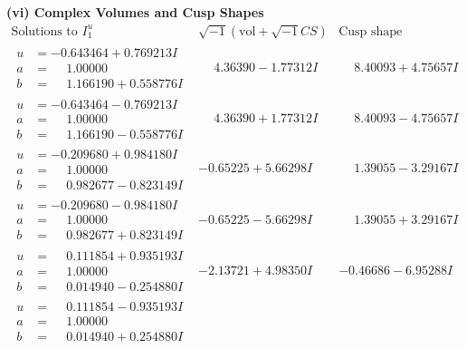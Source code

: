 \documentclass[1p]{elsarticle_modified}
\theoremstyle{definition}
\newcommand{\I}{\sqrt{-1}}
\begin{document}
\newpage\flushleft \textbf{(vi) Complex Volumes and Cusp Shapes}
$$\begin{array}{c|c|c}  
\text{Solutions to }I^u_{1}& \I (\text{vol} + \sqrt{-1}CS) & \text{Cusp shape}\\
 \hline 
\begin{aligned}
u &= -0.643464 + 0.769213 I \\
a &= \phantom{-}1.00000\phantom{ +0.000000I} \\
b &= \phantom{-}1.166190 + 0.558776 I\end{aligned}
 & \phantom{-}4.36390 - 1.77312 I & \phantom{-}8.40093 + 4.75657 I \\ \hline\begin{aligned}
u &= -0.643464 - 0.769213 I \\
a &= \phantom{-}1.00000\phantom{ +0.000000I} \\
b &= \phantom{-}1.166190 - 0.558776 I\end{aligned}
 & \phantom{-}4.36390 + 1.77312 I & \phantom{-}8.40093 - 4.75657 I \\ \hline\begin{aligned}
u &= -0.209680 + 0.984180 I \\
a &= \phantom{-}1.00000\phantom{ +0.000000I} \\
b &= \phantom{-}0.982677 - 0.823149 I\end{aligned}
 & -0.65225 + 5.66298 I & \phantom{-}1.39055 - 3.29167 I \\ \hline\begin{aligned}
u &= -0.209680 - 0.984180 I \\
a &= \phantom{-}1.00000\phantom{ +0.000000I} \\
b &= \phantom{-}0.982677 + 0.823149 I\end{aligned}
 & -0.65225 - 5.66298 I & \phantom{-}1.39055 + 3.29167 I \\ \hline\begin{aligned}
u &= \phantom{-}0.111854 + 0.935193 I \\
a &= \phantom{-}1.00000\phantom{ +0.000000I} \\
b &= \phantom{-}0.014940 - 0.254880 I\end{aligned}
 & -2.13721 + 4.98350 I & -0.46686 - 6.95288 I \\ \hline\begin{aligned}
u &= \phantom{-}0.111854 - 0.935193 I \\
a &= \phantom{-}1.00000\phantom{ +0.000000I} \\
b &= \phantom{-}0.014940 + 0.254880 I\end{aligned}

\end{array}$$
\end{document}
